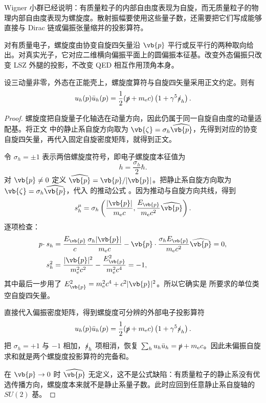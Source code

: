 Wigner 小群已经说明：有质量粒子的内部自由度表现为自旋，而无质量粒子的物理内部自由度表现为螺旋度。散射振幅要使用这些量子数，还需要把它们写成能够直接与 Dirac 链或偏振张量缩并的投影算符。

对有质量电子，螺旋度由协变自旋四矢量沿 $\vb{p}$ 平行或反平行的两种取向给出。对真实光子，它对应二维横向偏振平面上的圆偏振本征基。改变外态偏振只改变 LSZ 外腿的投影，不改变 QED 相互作用顶角本身。




\begin{proposition}[螺旋度旋量的秩一投影]
设三动量非零，外态在正能壳上，螺旋度算符与自旋四矢量采用正文约定。则有
\begin{equation}
 {
 u_h(p)\bar u_h(p)
 =\frac12(\slashed p+m_{\mathrm e} c)
 \left(1+\gamma^5\slashed s_h\right).}
\label{eq:electron-helicity-projector-dp9}
\end{equation}
\end{proposition}
\begin{proof}
螺旋度把自旋量子化轴选在动量方向，因此仍属于同一自旋自由度的动量适配基。将正文 中的静止系自旋方向取为 $\vb{\zeta}=\sigma_h\widehat{\vb{p}}$，先得到对应的协变自旋四矢量，再代入固定自旋密度矩阵，就得到正文。



令 $\sigma_h=\pm1$ 表示两倍螺旋度符号，即电子螺旋度本征值为
\begin{equation*}
 h=\frac{\sigma_h}{2}\hbar.
\end{equation*}
对 $\vb{p}\neq0$ 定义 $\widehat{\vb{p}}=\vb{p}/|\vb{p}|$。把静止系自旋方向取为 $\vb{\zeta}=\sigma_h\widehat{\vb{p}}$，代入 的推动公式 。因为推动与自旋方向共线，得到
\begin{equation*}
 {
 s_h^\mu
 =\sigma_h\left(
 \frac{|\vb{p}|}{m_{\mathrm e} c},
 \frac{E_{\vb{p}}}{m_{\mathrm e} c^2}\widehat{\vb{p}}
 \right).}
 \end{equation*}
逐项检查：
\begin{align*}
 p\!\cdot s_h
 &=\frac{E_{\vb{p}}}{c}\frac{\sigma_h|\vb{p}|}{m_{\mathrm e} c}
 -\vb{p}\cdot
 \frac{\sigma_hE_{\vb{p}}}{m_{\mathrm e} c^2}\widehat{\vb{p}}
 =0,\\
 s_h^2
 &=\frac{|\vb{p}|^2}{m_{\mathrm e}^2c^2}
 -\frac{E_{\vb{p}}^2}{m_{\mathrm e}^2c^4}
 =-1,
\end{align*}
其中最后一步用了 $E_{\vb{p}}^2=m_{\mathrm e}^2c^4+c^2|\vb{p}|^2$。所以它确实是  所要求的单位类空自旋四矢量。

直接代入偏振密度矩阵，得到螺旋度可分辨的外部电子投影算符
\begin{equation*}
 {
 u_h(p)\bar u_h(p)
 =\frac12(\slashed p+m_{\mathrm e} c)
 \left(1+\gamma^5\slashed s_h\right).}
 \end{equation*}
把 $\sigma_h=+1$ 与 $-1$ 相加，$\slashed s_h$ 项相消，恢复
$\sum_hu_h\bar u_h=\slashed p+m_{\mathrm e} c$。因此未偏振自旋求和就是两个螺旋度投影算符的完备和。

在 $\vb{p}\to0$ 时 $\widehat{\vb{p}}$ 无定义，这不是公式缺陷：有质量粒子的静止系没有优选传播方向，螺旋度本来就不是静止系量子数。此时应回到任意静止系自旋轴的 $SU(2)$ 基。
\end{proof}
